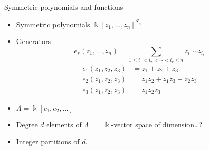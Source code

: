 \documentclass[dvipsnames]{beamer}
\newcommand{\sym}{\Lambda}
\newcommand{\kk}{\Bbbk}
\theoremstyle{definition}
\newcounter{c}
\begin{document}
\begin{frame}{Symmetric polynomials and functions}
  \begin{itemize}
  \item Symmetric polynomials \(\kk[z_1,\ldots,z_n]^{S_n}\)
  \item Generators
    \[
       e_r(z_1,\ldots,z_n) = \sum_{1 \leq i_1 < i_2 <\cdots < i_r
      \leq n} z_{i_1} \cdots z_{i_r}
    \]
    \begin{align*}
      e_1(z_1,z_2,z_3) &= z_1 + z_2 + z_3  \\
      e_2(z_1,z_2,z_3) &= z_1 z_2 + z_1 z_3 + z_2 z_3\\
      e_3(z_1,z_2,z_3) &= z_1 z_2 z_3 
    \end{align*}
    \pause
  \item \(\Lambda = \kk[e_1,e_2,\ldots]\)\pause
  \item Degree \(d\) elements of \(\Lambda\) \(=\) \(\kk\)-vector
    space of dimension\ldots?\pause
  \item Integer partitions of \(d\).
  \end{itemize}
\end{frame}
\end{document}

